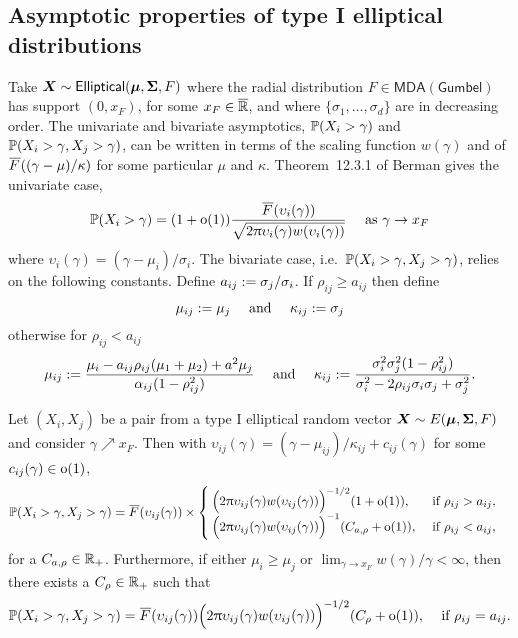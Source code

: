 \begin{subappendices}
\subsection{Asymptotic properties of type I elliptical distributions}

Take $\bm{X} \sim \mathsf{Elliptical}(\bm{\mu}, \bm{\Sigma}, F)$ where the radial distribution $F \in \mathsf{MDA(Gumbel)}$ has support $(0,x_F)$, for some $x_F \in \overline{\mathbb{R}}$, and where $\{\sigma_1, \dots, \sigma_d\}$ are in decreasing order.
The univariate and bivariate asymptotics, $\operatorname{{\mathbb P}}(X_i > \gamma)$ and $\operatorname{{\mathbb P}}(X_i > \gamma, X_j > \gamma)$, can be written in terms of the scaling function $w(\gamma)$ and of $\Ftail((\gamma-\mu)/\kappa)$ for some particular $\mu$ and $\kappa$.
Theorem~12.3.1 of Berman \cite{berman1992sojourns} gives the univariate case,
\begin{equation} \label{berman}
 \Prob(X_i > \gamma) =  (1+\oh(1)) \frac{ \Ftail(\upsilon_i(\gamma)) }
 {\sqrt{2\pi \upsilon_i(\gamma) w(\upsilon_i(\gamma)) }} \quad \text{ as } \gamma \to x_F
\end{equation}
where $\upsilon_i(\gamma) = (\gamma - \mu_i)/\sigma_i$. The bivariate case, i.e.\ $\operatorname{{\mathbb P}}(X_i > \gamma, X_j > \gamma)$, relies on the following constants. Define $a_{ij} := \sigma_j/\sigma_i$. If $\rho_{ij} \ge a_{ij}$ then define
 \[ \mu_{ij} := \mu_j \quad \text{ and } \quad \kappa_{ij} := \sigma_j \]
 otherwise for $\rho_{ij} < a_{ij}$
 \[ \mu_{ij} := \frac{\mu_i-a_{ij}\rho_{ij}(\mu_1+\mu_2)+a^2\mu_j}{\alpha_{ij}(1-\rho^2_{ij})} \quad \text{ and } \quad \kappa_{ij} := \frac{\sigma_i^2\sigma_j^2(1-\rho^2_{ij})}{ {\sigma_i^2-2\rho_{ij}\sigma_i\sigma_j + \sigma_{j}^2}}. \]

\begin{theorem} \label{thm:type_1_asymptotics}
 Let $(X_i, X_j)$ be a pair from a type I elliptical random vector $\bm{X} \sim E(\bm{\mu}, \bm{\Sigma}, F)$
 and consider $\gamma \nearrow x_F$.
Then with $\upsilon_{ij}(\gamma)=(\gamma-\mu_{ij})/\kappa_{ij}+c_{ij}(\gamma)$ for some $c_{ij}(\gamma) \in {\mathrm{o}}(1)$,
 \begin{align*}
   \Prob(X_i > \gamma, X_j > \gamma)
   &= \Ftail(\upsilon_{ij}(\gamma)) \times \begin{cases}
   		 \Bigl( 2\pi \upsilon_{ij}(\gamma) w(\upsilon_{ij}(\gamma)) \Bigr)^{-1/2}(1 + \oh(1)),
   		 & \text{ if } \rho_{ij} > a_{ij}, \\%
         \Bigl( 2\pi \upsilon_{ij}(\gamma) w(\upsilon_{ij}(\gamma)) \Bigr)^{-1}(C_{a,\rho} + \oh(1)),
         & \text{ if } \rho_{ij} < a_{ij},
   	\end{cases}
 \end{align*}
 for a $C_{a,\rho} \in \mathbb{R}_+$.
Furthermore, if either $\mu_i\ge\mu_j$ or $\lim_{\gamma\to x_F}w(\gamma)/\gamma<\infty$, then there exists a $C_\rho \in \mathbb{R}_+$ such that
 \begin{align*}
   \Prob(X_i > \gamma, X_j > \gamma)
   &= \Ftail(\upsilon_{ij}(\gamma)) \Bigl( 2\pi \upsilon_{ij}(\gamma) w(\upsilon_{ij}(\gamma)) \Bigr)^{-1/2}(C_\rho + \oh(1)),
   		 & \text{ if } \rho_{ij} = a_{ij}.
 \end{align*}
\end{theorem}


\end{subappendices}
